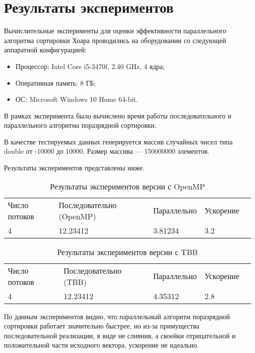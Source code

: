 \documentclass{report}
\begin{document}
\section*{Результаты экспериментов}
Вычислительные эксперименты для оценки эффективности параллельного алгоритма сортировки Хоара проводились на оборудовании со следующей аппаратной конфигурацией:

\begin{itemize}
\item Процессор: Intel Core i5-3470f, 2.40 GHz, 4 ядра;
\item Оперативная память: 8 ГБ;
\item ОС: Microsoft Windows 10 Home 64-bit.
\end{itemize}

\par В рамках эксперимента было вычислено время работы последовательного и параллельного алгоритма поразрядной сортировки.
\par В качестве тестируемых данных генерируется массив случайных чисел типа double от -10000 до 10000. Размер массива --- 150000000 элементов.
\par Результаты экспериментов представлены ниже.

\begin{table}[!h]
\caption{Результаты экспериментов версии с OpenMP}
\centering
\begin{tabular}{lllll}
Число потоков & Последовательно (OpenMP) & Параллельно & Ускорение  \\
4        & 12.23412         & 3.81234     & 3.2     \\
      
\end{tabular}
\end{table}

\begin{table}[!h]
\caption{Результаты экспериментов версии с TBB}
\centering
\begin{tabular}{lllll}
Число потоков & Последовательно (TBB) & Параллельно & Ускорение  \\
4        & 12.23412         & 4.35312    & 2.8       \\
      
\end{tabular}
\end{table}

\par По данным экспериментов видно, что параллельный алгоритм поразрядной сортировки работает значительно быстрее, но из-за примущества последовательной реализации, в виде не слияния, а скоейки отрицательной и положительной части исходного вектора, ускорение не идеально.
\newpage
\end{document}
